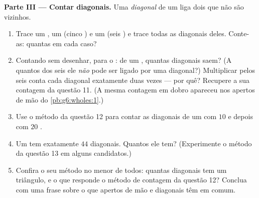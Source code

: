 \begin{problem}
\medskip
\noindent\textbf{Parte III --- Contar diagonais.}
Uma \emph{diagonal} de um  liga dois  que não são
vizinhos.
\begin{enumerate}[resume]
  \item Trace um , um  (cinco ) e um
         (seis ) e trace todas as diagonais deles.
        Conte-as: quantas em cada caso?
  \item Contando sem desenhar, para o : de um , quantas
        diagonais saem? (A quantos dos seis  ele \emph{não}
        pode ser ligado por uma diagonal?) Multiplicar pelos seis
         conta cada diagonal exatamente duas vezes --- por quê?
        Recupere a sua contagem da questão 11. (A mesma contagem em
        dobro apareceu nos apertos de mão do \cref{pb:g6:wholes:1}.)
  \item Use o método da questão 12 para contar as diagonais de um
         com $10$  e depois com $20$ .
  \item Um  tem exatamente $44$ diagonais. Quantos  ele
        tem? (Experimente o método da questão 13 em alguns
        candidatos.)
  \item Confira o seu método no menor  de todos: quantas
        diagonais tem um triângulo, e o que responde o método de
        contagem da questão 12? Conclua com uma frase sobre o que
        apertos de mão e diagonais têm em comum.
\end{enumerate}
\end{problem}
